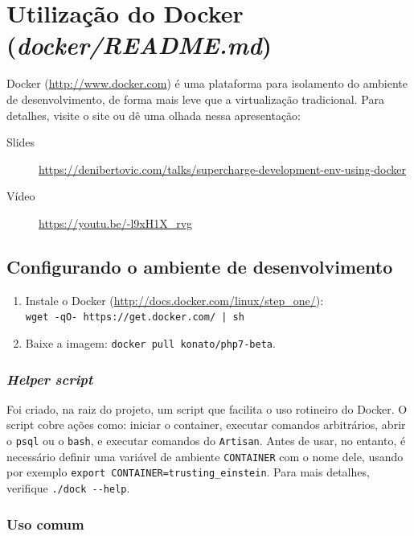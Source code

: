\documentclass[12pt,a4paper,twoside,hyphens,english,brazil]{abntex2}
\begin{document}
{\begin{otherlanguage}{english}
\end{otherlanguage}


\section{Utilização do Docker (\emph{docker/README.md})}

Docker (\url{http://www.docker.com}) é uma plataforma para isolamento do ambiente de desenvolvimento, de forma mais leve que a virtualização tradicional. Para detalhes, visite o site ou dê uma olhada nessa apresentação:
\begin{description}
	\item[Slides] \url{https://denibertovic.com/talks/supercharge-development-env-using-docker}
	\item[Vídeo] \url{https://youtu.be/-l9xH1X_rvg}
\end{description}

\subsection{Configurando o ambiente de desenvolvimento}
\begin{enumerate}
	\item Instale o Docker (\url{http://docs.docker.com/linux/step_one/}):\\ \texttt{wget -qO- https://get.docker.com/ | sh} 
	\item Baixe a imagem: \texttt{docker pull konato/php7-beta}.
\end{enumerate}

\subsubsection{\emph{Helper script}}
Foi criado, na raiz do projeto, um script que facilita o uso rotineiro do Docker. O script cobre ações como: iniciar o container, executar comandos arbitrários, abrir o \texttt{psql} ou o \texttt{bash}, e executar comandos do \texttt{Artisan}. Antes de usar, no entanto, é necessário definir uma variável de ambiente \texttt{CONTAINER} com o nome dele, usando por exemplo \texttt{export CONTAINER=trusting\_einstein}. Para mais detalhes, verifique \texttt{./dock -{}-help}.

\subsubsection{Uso comum}

}
\end{document}
